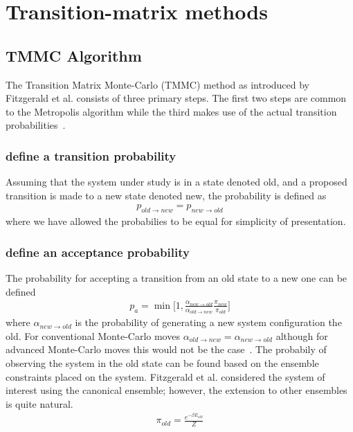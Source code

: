 \documentclass[letterpaper,twocolumn,amsmath,amssymb,pre,aps,10pt]{revtex4-1}
\begin{document}
\section{Transition-matrix methods}\label{sec:transition}

\subsection{TMMC Algorithm}
The Transition Matrix Monte-Carlo (TMMC) method as introduced by
Fitzgerald et al. consists of three primary steps.  The first two steps
are common to the Metropolis algorithm while the third makes use of the
actual transition probabilities~\cite{fitzgerald2000monte}.

\subsubsection{define a transition probability}
Assuming that the system under study is in a state denoted old, and a
proposed transition is made to a new state denoted new, the probability
is defined as
\begin{align}
  p_{old \rightarrow new} = p_{new \rightarrow old}
\end{align}
where we have allowed the probabilies to be equal for simplicity of
presentation.

\subsubsection{define an acceptance probability}
The probability for accepting a transition from an old state to a new
one can be defined
\begin{align}
  p_{a} = \min\bigg[1,\frac{\alpha_{new\rightarrow old}}
  {\alpha_{old \rightarrow new}}\frac{\pi_{new}}{\pi_{old}}\bigg]
\end{align}
where $\alpha_{new\rightarrow old}$ is the probability of generating a
new system configuration the old.  For conventional Monte-Carlo moves
$\alpha_{old \rightarrow new} =\alpha_{new\rightarrow old}$ although
for advanced Monte-Carlo moves this would not be the
case~\cite{paluch2008comparing, siepmann1990method}.  The probabily of
observing the system in the old state can be found based on the
ensemble constraints placed on the system.  Fitzgerald et al.
considered the system of interest using the canonical ensemble;
however, the extension to other ensembles is quite natural.
\begin{align}
  \pi_{old} = \frac{e^{-\beta E_{old}}}{Z}
\end{align}
\end{document}
